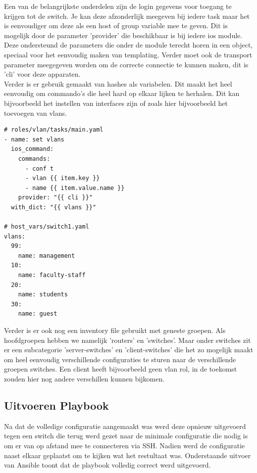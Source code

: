 Een van de belangrijkste onderdelen zijn de login gegevens voor toegang te krijgen tot de switch. Je kan deze afzonderlijk meegeven bij iedere task maar het is eenvoudiger om deze als een host of group variable mee te geven. Dit is mogelijk door de parameter 'provider' die beschikbaar is bij iedere ios module. Deze ondersteund de parameters die onder de module terecht horen in een object, speciaal voor het eenvoudig maken van templating. Verder moet ook de transport parameter meegegeven worden om de correcte connectie te kunnen maken, dit is 'cli' voor deze apparaten.
\\

Verder is er gebruik gemaakt van hashes als variabelen. Dit maakt het heel eenvoudig om commando's die heel hard op elkaar lijken te herhalen. Dit kan bijvoorbeeld het instellen van interfaces zijn of zoals hier bijvoorbeeld het toevoegen van vlans.

\begin{center}
\begin{BVerbatim}
# roles/vlan/tasks/main.yaml
- name: set vlans
  ios_command:
    commands:
      - conf t
      - vlan {{ item.key }}
      - name {{ item.value.name }}
    provider: "{{ cli }}"
  with_dict: "{{ vlans }}"
  
# host_vars/switch1.yaml
vlans:
  99:
    name: management
  10:
    name: faculty-staff
  20:
    name: students
  30:
    name: guest
\end{BVerbatim}
\end{center}

Verder is er ook nog een inventory file gebruikt met geneste groepen. Als hoofdgroepen hebben we namelijk 'routers' en 'switches'. Maar onder switches zit er een subcategorie 'server-switches' en 'client-switches' die het zo mogelijk maakt om heel eenvoudig verschillende configuraties te sturen naar de verschillende groepen switches. Een client heeft bijvoorbeeld geen vlan rol, in de toekomst zouden hier nog andere verschillen kunnen bijkomen.

\subsection{Uitvoeren Playbook}
\label{ch:ansibleplaybookexecution}

Na dat de volledige configuratie aangemaakt was werd deze opnieuw uitgevoerd tegen een switch die terug werd gezet naar de minimale configuratie die nodig is om er van op afstand mee te connecteren via SSH. Nadien werd de configuratie naast elkaar geplaatst om te kijken wat het restultaat was. Onderstaande uitvoer van Ansible toont dat de playbook volledig correct werd uitgevoerd.

